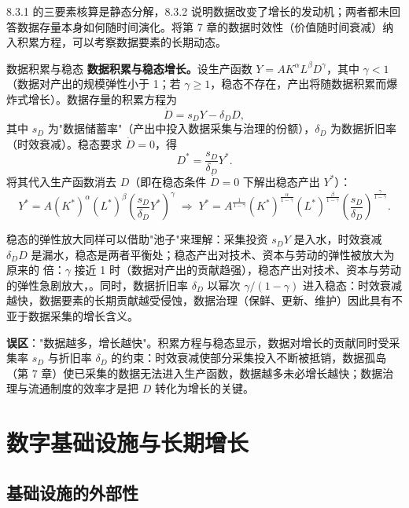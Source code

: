 8.3.1 的三要素核算是静态分解，8.3.2 说明数据改变了增长的发动机；两者都未回答数据存量本身如何随时间演化。将第 7 章的数据时效性（价值随时间衰减）纳入积累方程，可以考察数据要素的长期动态。

\begin{derivation}{数据积累与稳态}{}
\textbf{数据积累与稳态增长。}设生产函数 $Y = A K^\alpha L^\beta D^\gamma$，其中 $\gamma < 1$（数据对产出的规模弹性小于 1；若 $\gamma \geq 1$，稳态不存在，产出将随数据积累而爆炸式增长）。数据存量的积累方程为
\[
\dot D = s_D Y - \delta_D D,
\]
其中 $s_D$ 为"数据储蓄率"（产出中投入数据采集与治理的份额），$\delta_D$ 为数据折旧率（时效衰减）。稳态要求 $\dot D = 0$，得
\[
D^* = \frac{s_D}{\delta_D} Y^*.
\]
将其代入生产函数消去 $D$（即在稳态条件 $\dot D = 0$ 下解出稳态产出 $Y^*$）：
\[
Y^* = A (K^*)^{\alpha} (L^*)^{\beta} \left(\frac{s_D}{\delta_D} Y^*\right)^{\gamma}
\;\Rightarrow\;
Y^* = A^{\frac{1}{1-\gamma}} (K^*)^{\frac{\alpha}{1-\gamma}} (L^*)^{\frac{\beta}{1-\gamma}} \left(\frac{s_D}{\delta_D}\right)^{\frac{\gamma}{1-\gamma}}.
\]
\end{derivation}

稳态的弹性放大同样可以借助"池子"来理解：采集投资 $s_D Y$ 是入水，时效衰减 $\delta_D D$ 是漏水，稳态是两者平衡处；稳态产出对技术、资本与劳动的弹性被放大为原来的  倍：$\gamma$ 接近 1 时（数据对产出的贡献趋强），稳态产出对技术、资本与劳动的弹性急剧放大，。同时，数据折旧率 $\delta_D$ 以幂次 $\gamma/(1-\gamma)$ 进入稳态：时效衰减越快，数据要素的长期贡献越受侵蚀，数据治理（保鲜、更新、维护）因此具有不亚于数据采集的增长含义。

\begin{misconception}
\textbf{误区}："数据越多，增长越快"。积累方程与稳态显示，数据对增长的贡献同时受采集率 $s_D$ 与折旧率 $\delta_D$ 的约束：时效衰减使部分采集投入不断被抵销，数据孤岛（第 7 章）使已采集的数据无法进入生产函数，数据越多未必增长越快；数据治理与流通制度的效率才是把 $D$ 转化为增长的关键。
\end{misconception}

\section{数字基础设施与长期增长}

\subsection{基础设施的外部性}

